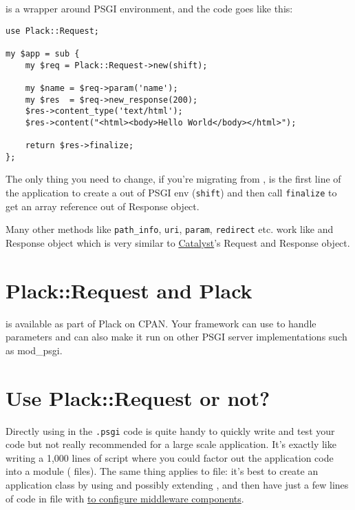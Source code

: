  is a wrapper around PSGI environment, and the code goes
like this:

\begin{lstlisting}
use Plack::Request;

my $app = sub {
    my $req = Plack::Request->new(shift);
    
    my $name = $req->param('name');
    my $res  = $req->new_response(200);
    $res->content_type('text/html');
    $res->content("<html><body>Hello World</body></html>");
    
    return $res->finalize;
};
\end{lstlisting}

The only thing you need to change, if you're migrating from
, is the first line of the application to create a
 out of PSGI env (\lstinline!shift!) and then call
\lstinline!finalize! to get an array reference out of Response object.

Many other methods like \lstinline!path_info!, \lstinline!uri!,
\lstinline!param!, \lstinline!redirect! etc. work like
 and Response object which is very similar to
\href{http://search.cpan.org/dist/Catalyst-Runtime}{Catalyst}'s Request
and Response object.

\section{Plack::Request and Plack}\label{plackrequest-and-plack}

 is available as part of Plack on CPAN. Your framework can
use  to handle parameters and can also make it run on
other PSGI server implementations such as mod\_psgi.

\section{Use Plack::Request or not?}\label{use-plackrequest-or-not}

Directly using  in the \lstinline!.psgi! code is quite
handy to quickly write and test your code but not really recommended for
a large scale application. It's exactly like writing a 1{,}000 lines of
 script where you could factor out the application code
into a module ( files). The same thing applies to
 file: it's best to create an application class by
using and possibly extending , and then have just a few
lines of code in  file with
\href{http://advent.plackperl.org/2009/12/day-11-using-plackbuilder.html}{
to configure middleware components}.

